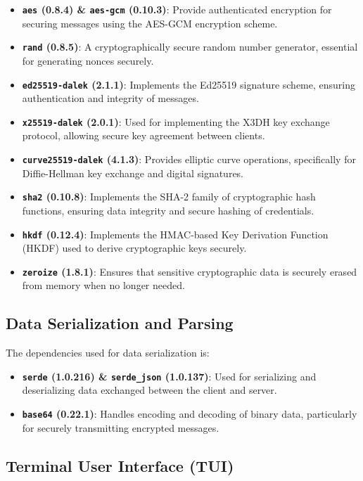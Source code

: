\begin{itemize}
  \item \textbf{\texttt{aes} (0.8.4) \& \texttt{aes-gcm} (0.10.3)}: Provide authenticated encryption for securing messages using the AES-GCM encryption scheme.
  \item \textbf{\texttt{rand} (0.8.5)}: A cryptographically secure random number generator, essential for generating nonces securely.
  \item \textbf{\texttt{ed25519-dalek} (2.1.1)}: Implements the Ed25519 signature scheme, ensuring authentication and integrity of messages.
  \item \textbf{\texttt{x25519-dalek} (2.0.1)}: Used for implementing the X3DH key exchange protocol, allowing secure key agreement between clients.
  \item \textbf{\texttt{curve25519-dalek} (4.1.3)}: Provides elliptic curve operations, specifically for Diffie-Hellman key exchange and digital signatures.
  \item \textbf{\texttt{sha2} (0.10.8)}: Implements the SHA-2 family of cryptographic hash functions, ensuring data integrity and secure hashing of credentials.
  \item \textbf{\texttt{hkdf} (0.12.4)}: Implements the HMAC-based Key Derivation Function (HKDF) used to derive cryptographic keys securely.
  \item \textbf{\texttt{zeroize} (1.8.1)}: Ensures that sensitive cryptographic data is securely erased from memory when no longer needed.
\end{itemize}

\subsection{Data Serialization and Parsing}  
\label{subsec:DataSerializatinAndParsin}

The dependencies used for data serialization is:

\begin{itemize}
  \item \textbf{\texttt{serde} (1.0.216) \& \texttt{serde\_json} (1.0.137)}: Used for serializing and deserializing data exchanged between the client and server.
  \item \textbf{\texttt{base64} (0.22.1)}: Handles encoding and decoding of binary data, particularly for securely transmitting encrypted messages.
\end{itemize}

\subsection{Terminal User Interface (TUI)}  
\label{subsed:TerminalUserInterfaceTUI}

